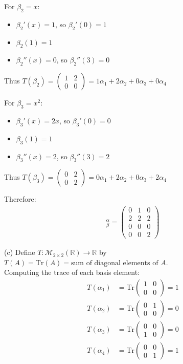 \documentclass{article}
\begin{document}
For $\beta_2 = x$:
\begin{itemize}
    \item $\beta_2'(x) = 1$, so $\beta_2'(0) = 1$
    \item $\beta_2(1) = 1$
    \item $\beta_2''(x) = 0$, so $\beta_2''(3) = 0$
\end{itemize}

Thus $T(\beta_2) = \begin{pmatrix} 1 & 2 \\ 0 & 0 \end{pmatrix} = 1\alpha_1 + 2\alpha_2 + 0\alpha_3 + 0\alpha_4$

For $\beta_3 = x^2$:
\begin{itemize}
    \item $\beta_3'(x) = 2x$, so $\beta_3'(0) = 0$
    \item $\beta_3(1) = 1$
    \item $\beta_3''(x) = 2$, so $\beta_3''(3) = 2$
\end{itemize}

Thus $T(\beta_3) = \begin{pmatrix} 0 & 2 \\ 0 & 2 \end{pmatrix} = 0\alpha_1 + 2\alpha_2 + 0\alpha_3 + 2\alpha_4$

Therefore:
\begin{align*}
[T]_{\beta}^{\alpha} = \begin{pmatrix} 
0 & 1 & 0 \\
2 & 2 & 2 \\
0 & 0 & 0 \\
0 & 0 & 2
\end{pmatrix}
\end{align*}

(c) Define $T : \mathcal{M}_{2\times2}(\mathbb{R}) \to \mathbb{R}$ by $T(A) = \text{Tr}(A) = \text{sum of diagonal elements of }A$. \\

Computing the trace of each basis element:
\begin{align*}
T(\alpha_1) &= \text{Tr}\begin{pmatrix} 1 & 0 \\ 0 & 0 \end{pmatrix} = 1\\
T(\alpha_2) &= \text{Tr}\begin{pmatrix} 0 & 1 \\ 0 & 0 \end{pmatrix} = 0\\
T(\alpha_3) &= \text{Tr}\begin{pmatrix} 0 & 0 \\ 1 & 0 \end{pmatrix} = 0\\
T(\alpha_4) &= \text{Tr}\begin{pmatrix} 0 & 0 \\ 0 & 1 \end{pmatrix} = 1
\end{align*}
\end{document}
